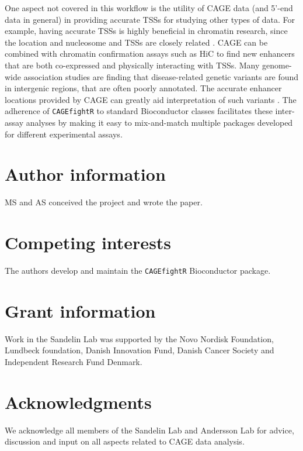 \documentclass[9pt,a4paper,]{extarticle}
\begin{document}
One aspect not covered in this workflow is the utility of CAGE data (and 5'-end data in general) in providing accurate TSSs for studying other types of data. For example, having accurate TSSs is highly beneficial in chromatin research, since the location and nucleosome and TSSs are closely related \citep{Andersson2014b, Duttke2015, Thodberg2018a}. CAGE can be combined with chromatin confirmation assays such as HiC to find new enhancers that are both co-expressed and physically interacting with TSSs. Many genome-wide association studies are finding that disease-related genetic variants are found in intergenic regions, that are often poorly annotated. The accurate enhancer locations provided by CAGE can greatly aid interpretation of such variants \citep{Boyd2018}. The adherence of \texttt{CAGEfightR} to standard Bioconductor classes facilitates these inter-assay analyses by making it easy to mix-and-match multiple packages developed for different experimental assays.

\section{Author information}\label{author-information}

MS and AS conceived the project and wrote the paper.

\section{Competing interests}\label{competing-interests}

The authors develop and maintain the \texttt{CAGEfightR} Bioconductor package.

\section{Grant information}\label{grant-information}

Work in the Sandelin Lab was supported by the Novo Nordisk Foundation, Lundbeck foundation, Danish Innovation Fund, Danish Cancer Society and Independent Research Fund Denmark.

\section{Acknowledgments}\label{acknowledgments}

We acknowledge all members of the Sandelin Lab and Andersson Lab for advice, discussion and input on all aspects related to CAGE data analysis.

{\small}
\end{document}
